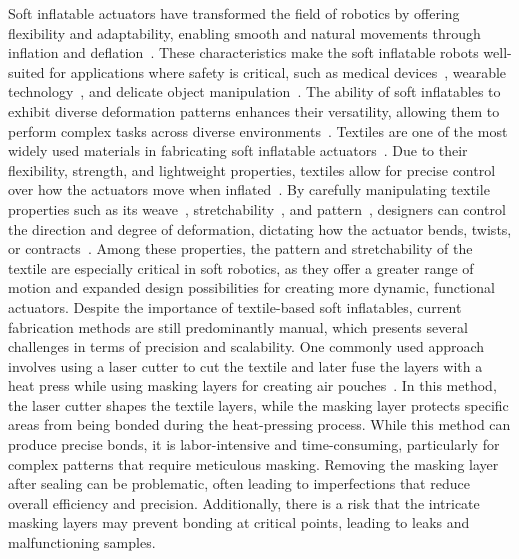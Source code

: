 \documentclass[journal, letterpaper]{IEEEtran}
\begin{document}
Soft inflatable actuators have transformed the field of robotics by offering flexibility and adaptability, enabling smooth and natural movements through inflation and deflation~\cite{airwelding,inflatable_review}. These characteristics make the soft inflatable robots well-suited for applications where safety is critical, such as medical devices~\cite{science_ranzani,cianchetti2018biomedical}, wearable technology~\cite{nguyen2020design,Thalmanwearable}, and delicate object manipulation~\cite{banana}. The ability of soft inflatables to exhibit diverse deformation patterns enhances their versatility, allowing them to perform complex tasks across diverse environments~\cite{growing,airwelding,pipe}.
Textiles are one of the most widely used materials in fabricating soft inflatable actuators~\cite{textilesoftrobot}. Due to their flexibility, strength, and lightweight properties, textiles allow for precise control over how the actuators move when inflated~\cite{walshtextile,Kneeexo}. By carefully manipulating textile properties such as its weave~\cite{sanchez20233dknitting}, stretchability~\cite{nguyen2020design}, and pattern~\cite{sciencetextile,kirigami_design}, designers can control the direction and degree of deformation, dictating how the actuator bends, twists, or contracts~\cite{sanchez20233dknitting,nguyen2020design,sciencetextile}. Among these properties, the pattern and stretchability of the textile are especially critical in soft robotics, as they offer a greater range of motion and expanded design possibilities for creating more dynamic, functional actuators.
Despite the importance of textile-based soft inflatables, current fabrication methods are still predominantly manual, which presents several challenges in terms of precision and scalability. One commonly used approach involves using a laser cutter to cut the textile and later fuse the layers with a heat press while using masking layers for creating air pouches~\cite{kirigami_design}. In this method, the laser cutter shapes the textile layers, while the masking layer protects specific areas from being bonded during the heat-pressing process. While this method can produce precise bonds, it is labor-intensive and time-consuming, particularly for complex patterns that require meticulous masking. Removing the masking layer after sealing can be problematic, often leading to imperfections that reduce overall efficiency and precision. Additionally, there is a risk that the intricate masking layers may prevent bonding at critical points, leading to leaks and malfunctioning samples.
\end{document}
